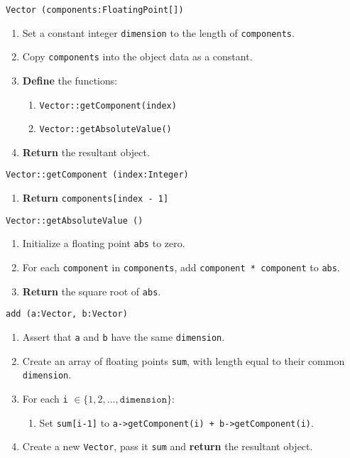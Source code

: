 \solution
\algorithm
\texttt{Vector (components:FloatingPoint[])}
\begin{enumerate}
	\item Set a constant integer \texttt{dimension} to the length of \texttt{components}.
	\item Copy \texttt{components} into the object data as a constant.
	\item \textbf{Define} the functions:
	\begin{enumerate}
		\item \texttt{Vector::getComponent(index)}
		\item \texttt{Vector::getAbsoluteValue()}
	\end{enumerate}
	\item \textbf{Return} the resultant object. 
\end{enumerate}
\vspace{5mm}
\texttt{Vector::getComponent (index:Integer)}
\begin{enumerate}
	\item \textbf{Return} \texttt{components[index - 1]}
\end{enumerate}
\vspace{5mm}
\texttt{Vector::getAbsoluteValue ()}
\begin{enumerate}
	\item Initialize a floating point \texttt{abs} to zero. 
	\item For each \texttt{component} in \texttt{components}, add \texttt{component * component} to \texttt{abs}.
	\item \textbf{Return} the square root of \texttt{abs}.
\end{enumerate}
\vspace{8mm}
\texttt{add (a:Vector, b:Vector)}
\begin{enumerate}
	\item Assert that \texttt{a} and \texttt{b} have the same \texttt{dimension}. 
	\item Create an array of floating points \texttt{sum}, with length equal to their common \texttt{dimension}.
	\item For each \texttt{i}  $\in \{1, 2, \dots, \mathtt{dimension}\}$:
	\begin{enumerate}
		\item Set \texttt{sum[i-1]} to \texttt{a->getComponent(i) + b->getComponent(i)}. 
	\end{enumerate}
	\item Create a new \texttt{Vector}, pass it \texttt{sum} and \textbf{return} the resultant object. 
\end{enumerate}
